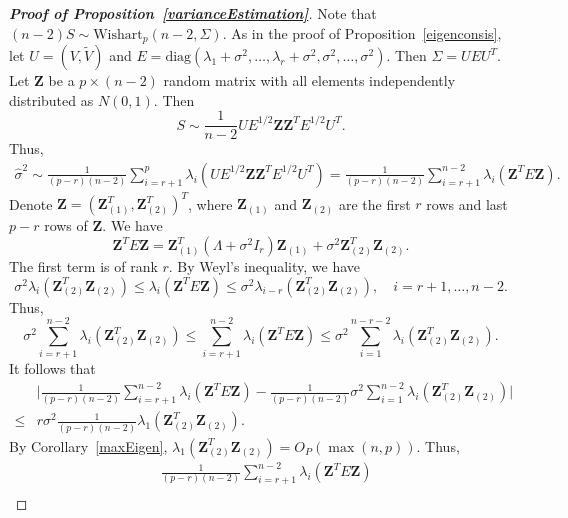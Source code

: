 \documentclass[review]{elsarticle}
\newcommand{\bZ}{\mathbf{Z}}
\theoremstyle{plain}
\theoremstyle{definition}
\theoremstyle{remark}
\begin{document}
\begin{proof}[\textbf{Proof of Proposition~\ref{varianceEstimation}}]
    Note that $(n-2)S\sim \mathrm{Wishart}_p (n-2,\Sigma)$.
As in the proof of Proposition~\ref{eigenconsis},
    let $U=(V,\tilde{V})$ and $E=\mathrm{diag}(\lambda_1+\sigma^2,\ldots,\lambda_r+\sigma^2,\sigma^2,\ldots,\sigma^2)$.
Then $\Sigma=UEU^T$.
    Let $\bZ$ be a $p\times (n-2)$ random matrix with all elements independently distributed as $N(0,1)$. Then
    $$
        S\sim \frac{1}{n-2} U E^{1/2} \bZ \bZ^T E^{1/2} U^T.
    $$
    Thus,
    \begin{equation*}
        \begin{aligned}
            \hat{\sigma}^2\sim
            \frac{1}{(p-r)(n-2)}\sum_{i=r+1}^p \lambda_i (U E^{1/2} \bZ \bZ^T E^{1/2} U^T)
            =
            \frac{1}{(p-r)(n-2)}\sum_{i=r+1}^{n-2} \lambda_i ( \bZ^T E \bZ).
        \end{aligned}
    \end{equation*}
    Denote $\bZ={(\bZ_{(1)}^T,\bZ_{(2)}^T)}^T$, where $\bZ_{(1)}$ and $\bZ_{(2)}$ are the first $r$ rows and last $p-r$ rows of $\bZ$. We have
    $$
    \bZ^T E \bZ =\bZ_{(1)}^T (\Lambda +\sigma^2 I_r) \bZ_{(1)}+\sigma^2 \bZ_{(2)}^T \bZ_{(2)}.
    $$
 The first term is of rank $r$. By Weyl's inequality, we have
    $$
    \sigma^2\lambda_i(\bZ_{(2)}^T \bZ_{(2)}) \leq \lambda_i(\bZ^T E \bZ)\leq
    \sigma^2\lambda_{i-r}(\bZ_{(2)}^T \bZ_{(2)}),
    \quad
    \textrm{$i=r+1,\ldots, n-2$}.
    $$
    Thus,
    $$
    \sigma^2\sum_{i=r+1}^{n-2}\lambda_i(\bZ_{(2)}^T \bZ_{(2)}) \leq \sum_{i=r+1}^{n-2}\lambda_i(\bZ^T E \bZ)\leq
    \sigma^2\sum_{i=1}^{n-r-2}\lambda_{i}(\bZ_{(2)}^T \bZ_{(2)}).
    $$
     It follows that
     \begin{equation*}
         \begin{aligned}
             &\Big|\frac{1}{(p-r)(n-2)}\sum_{i=r+1}^{n-2}\lambda_i(\bZ^T E \bZ)-
    \frac{1}{(p-r)(n-2)} \sigma^2\sum_{i=1}^{n-2}\lambda_{i}(\bZ_{(2)}^T \bZ_{(2)})\Big|
             \\
             \leq & r\sigma^2\frac{1}{(p-r)(n-2)} \lambda_1 (\bZ_{(2)}^T \bZ_{(2)}).
         \end{aligned}
     \end{equation*}
    By Corollary~\ref{maxEigen}, $\lambda_1 (\bZ_{(2)}^T \bZ_{(2)})=O_P(\max(n,p))$. 
    Thus,
     \begin{equation*}
         \begin{aligned}
             &\frac{1}{(p-r)(n-2)}\sum_{i=r+1}^{n-2}\lambda_i(\bZ^T E \bZ)\\

\end{aligned}
\end{equation*}
\end{proof}
\end{document}
